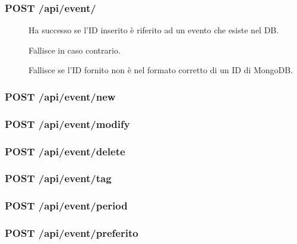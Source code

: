 \documentclass{article}
\begin{document}
\subsubsection{POST /api/event/}
\begin{description}
    \item[] Ha successo se l'ID inserito è riferito ad un evento che esiste nel DB.
    \item[] Fallisce in caso contrario.
    \item[] Fallisce se l'ID fornito non è nel formato corretto di un ID di MongoDB.
\end{description}
\subsubsection{POST /api/event/new}
\subsubsection{POST /api/event/modify}
\subsubsection{POST /api/event/delete}
\subsubsection{POST /api/event/tag}
\subsubsection{POST /api/event/period}
\subsubsection{POST /api/event/preferito}
\end{document}
